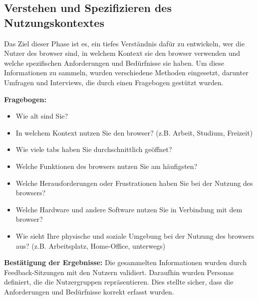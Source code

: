 \subsection{Verstehen und Spezifizieren des Nutzungskontextes}

Das Ziel dieser Phase ist es, ein tiefes Verständnis dafür zu entwickeln, wer die Nutzer des \gls{browser} sind, in welchem Kontext sie den \gls{browser} verwenden und welche spezifischen Anforderungen und Bedürfnisse sie haben. 
Um diese Informationen zu sammeln, wurden verschiedene Methoden eingesetzt, darunter Umfragen und Interviews, die durch einen Fragebogen gestützt wurden.

\textbf{Fragebogen:}
\begin{itemize}
    \item Wie alt sind Sie?
    \item In welchem Kontext nutzen Sie den \gls{browser}? (z.B. Arbeit, Studium, Freizeit)
    \item Wie viele \gls{tab}s haben Sie durchschnittlich geöffnet?
    \item Welche Funktionen des \gls{browser}s nutzen Sie am häufigsten?
    \item Welche Herausforderungen oder Frustrationen haben Sie bei der Nutzung des \gls{browser}s?
    \item Welche Hardware und andere Software nutzen Sie in Verbindung mit dem \gls{browser}?
    \item Wie sieht Ihre physische und soziale Umgebung bei der Nutzung des \gls{browser}s aus? (z.B. Arbeitsplatz, Home-Office, unterwegs)
\end{itemize}

\textbf{Bestätigung der Ergebnisse:}
Die gesammelten Informationen wurden durch Feedback-Sitzungen mit den Nutzern validiert. 
Daraufhin wurden Personas definiert, die die Nutzergruppen repräsentieren. 
Dies stellte sicher, dass die Anforderungen und Bedürfnisse korrekt erfasst wurden.


